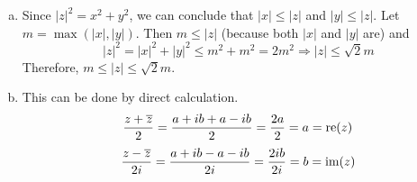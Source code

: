 \documentclass[../../Solutions.tex]{subfiles}
\begin{document}
\begin{itemize}
\begin{enumerate}[(a)]
			\item Since $|z|^2 = x^2+y^2$, we can conclude that $|x| \leq |z|$ and $|y| \leq |z|$. Let $m = \max(|x|,|y|)$. Then $m \leq |z|$ (because both $|x|$ and $|y|$ are) and
			$$ |z|^2 = |x|^2+|y|^2 \leq m^2+m^2 = 2m^2 \Rightarrow |z| \leq \sqrt{2}m $$
			Therefore, $m \leq |z| \leq \sqrt{2}m$.
			
			\item This can be done by direct calculation.
			$$ \frac{z+\overline{z}}{2} = \frac{a+ib+a-ib}{2} = \frac{2a}{2} = a = \text{re}(z) $$
			$$ \frac{z-\overline{z}}{2i} = \frac{a+ib-a-ib}{2i} = \frac{2ib}{2i} = b = \text{im}(z) $$
			
		\end{enumerate}
\end{itemize}
\end{document}
